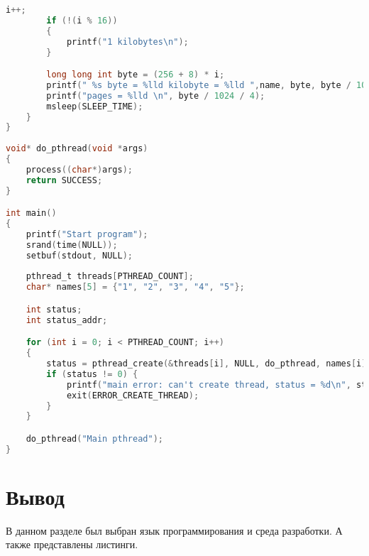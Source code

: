 \begin{lstlisting}[language=c, label=some-code, caption=Анализируемая программа]
		i++;
		if (!(i % 16))
		{
			printf("1 kilobytes\n");
		}

		long long int byte = (256 + 8) * i;
		printf(" %s byte = %lld kilobyte = %lld ",name, byte, byte / 1024);
		printf("pages = %lld \n", byte / 1024 / 4);
		msleep(SLEEP_TIME);
	}
}
	
void* do_pthread(void *args) 
{
	process((char*)args);
	return SUCCESS;
}

int main() 
{
	printf("Start program");
	srand(time(NULL));
	setbuf(stdout, NULL);
	
	pthread_t threads[PTHREAD_COUNT];
	char* names[5] = {"1", "2", "3", "4", "5"};

	int status;
	int status_addr;

	for (int i = 0; i < PTHREAD_COUNT; i++)
	{
		status = pthread_create(&threads[i], NULL, do_pthread, names[i]);
		if (status != 0) {
			printf("main error: can't create thread, status = %d\n", status);
			exit(ERROR_CREATE_THREAD);
		}
	}

	do_pthread("Main pthread"); 
}
\end{lstlisting}









\section{Вывод}

В данном разделе был выбран язык программирования и среда разработки.
А также представлены листинги.